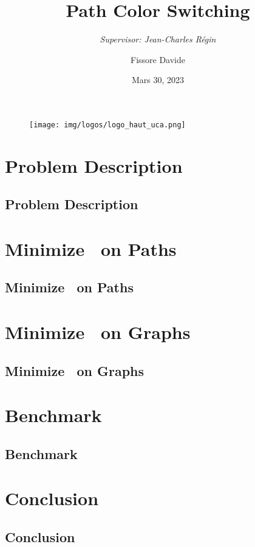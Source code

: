 \documentclass[usenames,dvipsnames,fleqn]{beamer}
\author{Fissore Davide}
\title{
    Path Color Switching\\
}
\subtitle{
    \small{\textit{Supervisor: Jean-Charles Régin}}
}
\date{Mars 30, 2023}
\begin{document}
\begin{frame}
    \titlepage
    \begin{figure}[htpb]
        \begin{center}
            \texttt{[image: img/logos/logo\_haut\_uca.png]}
        \end{center}
    \end{figure}
\end{frame}


\newcommand{\secsub}[1]{
    \section{#1}
    \subsection{#1}
}

\secsub{Problem Description}

\secsub{Minimize \ on Paths}

\secsub{Minimize \colorSwitch\ on Graphs}

\secsub{Benchmark}

\secsub{Conclusion}

\end{document}
